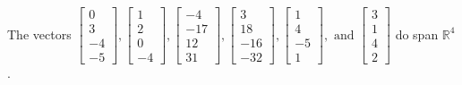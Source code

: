 \begin{exercise}
\begin{exerciseStatement}
  \end{exerciseStatement}
  \begin{exerciseAnswer}
   The vectors \(\left[\begin{array}{r}
0 \\
3 \\
-4 \\
-5
\end{array}\right] , \left[\begin{array}{r}
1 \\
2 \\
0 \\
-4
\end{array}\right] , \left[\begin{array}{r}
-4 \\
-17 \\
12 \\
31
\end{array}\right] , \left[\begin{array}{r}
3 \\
18 \\
-16 \\
-32
\end{array}\right] , \left[\begin{array}{r}
1 \\
4 \\
-5 \\
1
\end{array}\right] , \text{ and } \left[\begin{array}{r}
3 \\
1 \\
4 \\
2
\end{array}\right]\) 
  	 do  
	span \(\mathbb{R}^4\).
  


  \end{exerciseAnswer}
\end{exercise}